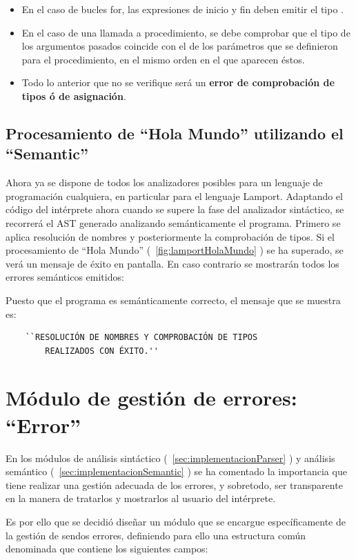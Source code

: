 \begin{enumerate}
\begin{itemize}
        \item En el caso de bucles for, las expresiones de inicio y fin deben emitir el tipo .
        \item En el caso de una llamada a procedimiento, se debe comprobar que el tipo de los argumentos pasados coincide con el de los parámetros que se definieron para el procedimiento, en el mismo orden en el que aparecen éstos.
        \item Todo lo anterior que no se verifique será un \textbf{error de comprobación de tipos ó de asignación}.
    \end{itemize}
\end{enumerate}

\subsection{Procesamiento de ``Hola Mundo'' utilizando el ``Semantic''}
Ahora ya se dispone de todos los analizadores posibles para un lenguaje de programación cualquiera, en particular para el lenguaje Lamport. Adaptando el código del intérprete ahora cuando se supere la fase del analizador sintáctico, se recorrerá el AST generado analizando semánticamente el programa. Primero se aplica resolución de nombres y posteriormente la comprobación de tipos. Si el procesamiento de ``Hola Mundo'' (~\ref{fig:lamportHolaMundo} ) se ha superado, se verá un mensaje de éxito en pantalla. En caso contrario se mostrarán todos los errores semánticos emitidos:



\noindent
Puesto que el programa es semánticamente correcto, el mensaje que se muestra es:
\begin{verbatim}
    ``RESOLUCIÓN DE NOMBRES Y COMPROBACIÓN DE TIPOS 
        REALIZADOS CON ÉXITO.''
\end{verbatim}

\section{Módulo de gestión de errores: ``Error''}\label{sec:implementacionError}
En los módulos de análisis sintáctico (~\ref{sec:implementacionParser} ) y análisis semántico (~\ref{sec:implementacionSemantic} ) se ha comentado la importancia que tiene realizar una gestión adecuada de los errores, y sobretodo, ser transparente en la manera de tratarlos y mostrarlos al usuario del intérprete.


Es por ello que se decidió diseñar un módulo que se encargue específicamente de la gestión de sendos errores, definiendo para ello una estructura común denominada  que contiene los siguientes campos:

